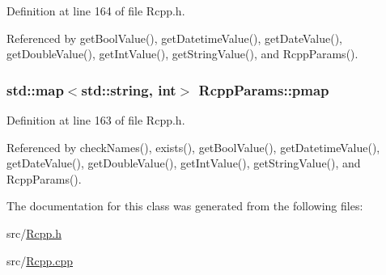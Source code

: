 Definition at line 164 of file Rcpp.h.

Referenced by getBoolValue(), getDatetimeValue(), getDateValue(), getDoubleValue(), getIntValue(), getStringValue(), and RcppParams().\hypertarget{classRcppParams_a399697fc90ba3136c61dd6e20931bd8b}{
\subsubsection[{pmap}]{\setlength{\rightskip}{0pt plus 5cm}std::map$<$std::string, int$>$ {\bf RcppParams::pmap}}}
\label{classRcppParams_a399697fc90ba3136c61dd6e20931bd8b}


Definition at line 163 of file Rcpp.h.

Referenced by checkNames(), exists(), getBoolValue(), getDatetimeValue(), getDateValue(), getDoubleValue(), getIntValue(), getStringValue(), and RcppParams().

The documentation for this class was generated from the following files:\begin{DoxyCompactItemize}
\item 
src/\hyperlink{Rcpp_8h}{Rcpp.h}\item 
src/\hyperlink{Rcpp_8cpp}{Rcpp.cpp}\end{DoxyCompactItemize}
